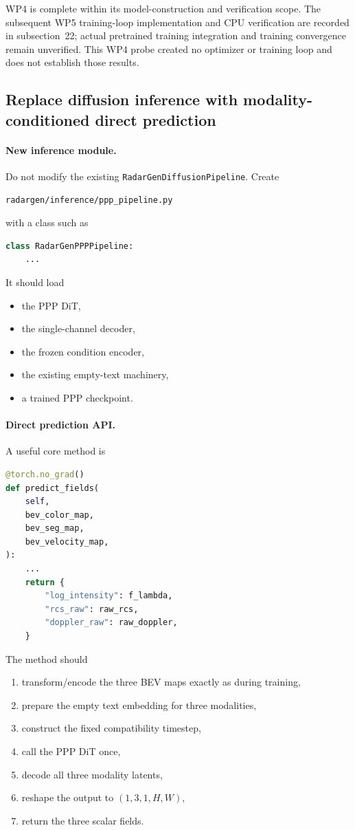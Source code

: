 \documentclass[11pt,a4paper]{article}
\begin{document}
WP4 is complete within its model-construction and verification scope.
The subsequent WP5 training-loop implementation and CPU verification are
recorded in subsection~22; actual pretrained training integration and
training convergence remain unverified. This WP4 probe created no optimizer
or training loop and does not establish those results.

\subsection{Replace diffusion inference with modality-conditioned direct prediction}

\paragraph{New inference module.}
Do not modify the existing \texttt{RadarGenDiffusionPipeline}. Create
\begin{lstlisting}
radargen/inference/ppp_pipeline.py
\end{lstlisting}
with a class such as
\begin{lstlisting}[language=Python]
class RadarGenPPPPipeline:
    ...
\end{lstlisting}

It should load
\begin{itemize}
    \item the PPP DiT,
    \item the single-channel decoder,
    \item the frozen condition encoder,
    \item the existing empty-text machinery,
    \item a trained PPP checkpoint.
\end{itemize}

\paragraph{Direct prediction API.}
A useful core method is
\begin{lstlisting}[language=Python]
@torch.no_grad()
def predict_fields(
    self,
    bev_color_map,
    bev_seg_map,
    bev_velocity_map,
):
    ...
    return {
        "log_intensity": f_lambda,
        "rcs_raw": raw_rcs,
        "doppler_raw": raw_doppler,
    }
\end{lstlisting}

The method should
\begin{enumerate}[label=\arabic*.]
    \item transform/encode the three BEV maps exactly as during training,
    \item prepare the empty text embedding for three modalities,
    \item construct the fixed compatibility timestep,
    \item call the PPP DiT once,
    \item decode all three modality latents,
    \item reshape the output to \((1,3,1,H,W)\),
    \item return the three scalar fields.
\end{enumerate}
\end{document}
